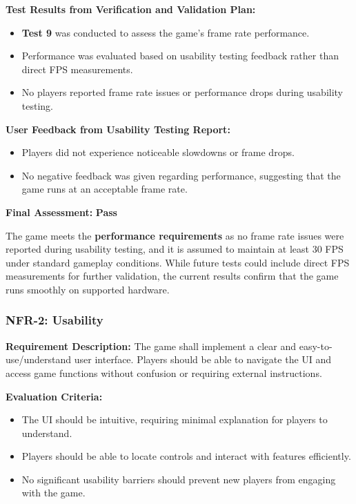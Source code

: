 \documentclass[12pt, titlepage]{article}
\begin{document}
\textbf{Test Results from Verification and Validation Plan:}  
\begin{itemize}
    \item \textbf{Test 9} was conducted to assess the game's frame rate performance.
    \item Performance was evaluated based on usability testing feedback rather than direct FPS measurements.
    \item No players reported frame rate issues or performance drops during usability testing.
\end{itemize}

\textbf{User Feedback from Usability Testing Report:}  
\begin{itemize}
    \item Players did not experience noticeable slowdowns or frame drops.
    \item No negative feedback was given regarding performance, suggesting that the game runs at an acceptable frame rate.
\end{itemize}

\textbf{Final Assessment:} \textbf{Pass}  

The game meets the \textbf{performance requirements} as no frame rate issues were reported during usability testing, and it is assumed to maintain at least 30 FPS under standard gameplay conditions. While future tests could include direct FPS measurements for further validation, the current results confirm that the game runs smoothly on supported hardware.

\subsubsection{NFR-2: Usability}

\textbf{Requirement Description:}  
The game shall implement a clear and easy-to-use/understand user interface. Players should be able to navigate the UI and access game functions without confusion or requiring external instructions.

\textbf{Evaluation Criteria:}  
\begin{itemize}
    \item The UI should be intuitive, requiring minimal explanation for players to understand.
    \item Players should be able to locate controls and interact with features efficiently.
    \item No significant usability barriers should prevent new players from engaging with the game.
\end{itemize}
\end{document}
